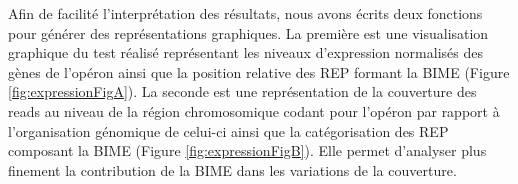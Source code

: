 \documentclass[12pt,a4paper]{report}
\begin{document}
\begin{onehalfspace}
Afin de facilité l’interprétation des résultats, nous avons écrits deux fonctions pour générer des représentations graphiques. La première est une visualisation graphique du test réalisé représentant les niveaux d’expression normalisés des gènes de l'opéron ainsi que la position relative des REP formant la BIME (Figure \autoref{fig:expressionFigA}). La seconde est une représentation de la couverture des reads au niveau de la région chromosomique codant pour l’opéron par rapport à l'organisation génomique de celui-ci ainsi que la catégorisation des REP composant la BIME (Figure \autoref{fig:expressionFigB}). Elle permet d’analyser plus finement la contribution de la BIME dans les variations de la couverture.

\begin{figure}[h]
\centering
{}

\end{figure}
\end{onehalfspace}
\end{document}

